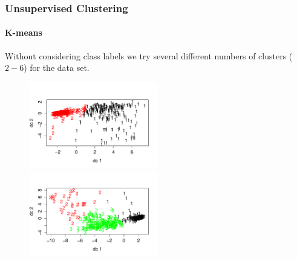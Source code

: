\documentclass[10pt]{beamer}
\begin{document}
\begin{frame}\frametitle{Unsupervised Clustering}
    \framesubtitle{K-means}
     Without considering class labels we try several different numbers of clusters ($2-6$) for the data set.
    \begin{figure}
        \centering
        \includegraphics[width=0.5\textwidth]{2.pdf}
        \includegraphics[width=0.5\textwidth]{3.pdf}
        \end{figure}

\end{frame}
\end{document}
